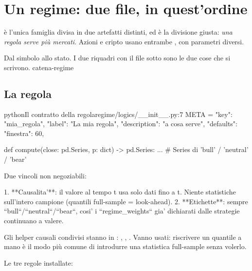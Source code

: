 \section{Un regime: due file, in quest'ordine}\label{sez:nuovo-regime}

\pkgRegime{} è l'unica famiglia divisa in due artefatti distinti, ed è la
divisione giusta: \emph{una regola serve più mercati}. Azioni e cripto usano
entrambe , con parametri diversi.

  {Dal simbolo allo stato. I due riquadri con il file sotto sono le due cose
   che si scrivono.}
  {catena-regime}

\subsection{La regola}

\begin{codiceInterno}{python}{Il contratto della regola}{regime/logics/\_\_init\_\_.py:7}
    META = {
        "key": "mia_regola",
        "label": "La mia regola",
        "description": "a cosa serve",
        "defaults": {"finestra": 60},
    }

    def compute(close: pd.Series, p: dict) -> pd.Series:
        ...   # Series di 'bull' / 'neutral' / 'bear'

Due vincoli non negoziabili:

1. **Causalita'**: il valore al tempo t usa solo dati fino a t. Niente
   statistiche sull'intero campione (quantili full-sample = look-ahead).
2. **Etichette**: sempre ``bull``/``neutral``/``bear``, cosi' i
   ``regime_weights`` gia' dichiarati dalle strategie continuano a valere.
\end{codiceInterno}

\noindent
Gli helper causali condivisi stanno in :
, ,
. Vanno usati: riscrivere un quantile a mano è il modo
più comune di introdurre una statistica full-sample senza volerlo.

Le tre regole installate:

